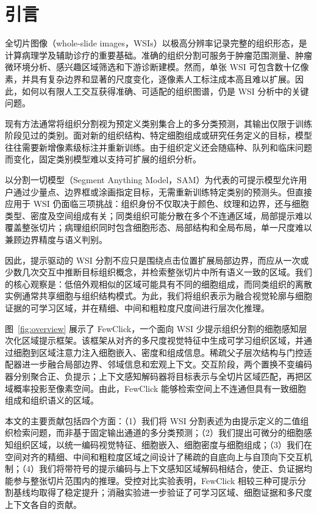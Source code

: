 \section{引言}

全切片图像（whole-slide images，WSIs）以极高分辨率记录完整的组织形态，是计算病理学及辅助诊疗的重要基础。准确的组织分割可服务于肿瘤范围测量、肿瘤微环境分析、感兴趣区域筛选和下游诊断建模。然而，单张 WSI 可包含数十亿像素，并具有复杂边界和显著的尺度变化，逐像素人工标注成本高且难以扩展。因此，如何以有限人工交互获得准确、可适配的组织图谱，仍是 WSI 分析中的关键问题。

现有方法通常将组织分割视为预定义类别集合上的多分类预测，其输出仅限于训练阶段见过的类别。面对新的组织结构、特定细胞组成或研究任务定义的目标，模型往往需要新增像素级标注并重新训练。由于组织定义还会随癌种、队列和临床问题而变化，固定类别模型难以支持可扩展的组织分析。

以分割一切模型（Segment Anything Model，SAM）为代表的可提示模型允许用户通过少量点、边界框或涂画指定目标，无需重新训练特定类别的预测头。但直接应用于 WSI 仍面临三项挑战：组织身份不仅取决于颜色、纹理和边界，还与细胞类型、密度及空间组成有关；同类组织可能分散在多个不连通区域，局部提示难以覆盖整张切片；病理组织同时包含细胞形态、局部结构和全局布局，单一尺度难以兼顾边界精度与语义判别。

因此，提示驱动的 WSI 分割不应只是围绕点击位置扩展局部边界，而应从一次或少数几次交互中推断目标组织概念，并检索整张切片中所有语义一致的区域。我们的核心观察是：低倍外观相似的区域可能具有不同的细胞组成，而同类组织的离散实例通常共享细胞与组织结构模式。为此，我们将组织表示为融合视觉轮廓与细胞证据的可学习区域，并在精细、中间和粗粒度尺度间进行层次化推理。

图~\ref{fig:overview} 展示了 FewClick，一个面向 WSI 少提示组织分割的细胞感知层次化区域提示框架。该框架从对齐的多尺度视觉特征中生成可学习组织区域，并通过细胞到区域注意力注入细胞嵌入、密度和组成信息。稀疏父子层次结构与门控适配器进一步融合局部边界、邻域信息和宏观上下文。交互阶段，两个置换不变编码器分别聚合正、负提示；上下文感知解码器将目标表示与全切片区域匹配，再把区域概率投影至像素空间。由此，FewClick 能够检索空间上不连通但具有一致细胞组成和组织语义的区域。

本文的主要贡献包括四个方面：（1）我们将 WSI 分割表述为由提示定义的二值组织检索问题，而非基于固定输出通道的多分类预测；（2）我们提出可微分的细胞感知组织区域，以统一编码视觉特征、细胞嵌入、细胞密度与细胞组成；（3）我们在空间对齐的精细、中间和粗粒度区域之间设计了稀疏的自底向上与自顶向下交互机制；（4）我们将带符号的提示编码与上下文感知区域解码相结合，使正、负证据均能参与整张切片范围内的推理。受控对比实验表明，FewClick 相较三种可提示分割基线均取得了稳定提升；消融实验进一步验证了可学习区域、细胞证据和多尺度上下文各自的贡献。
